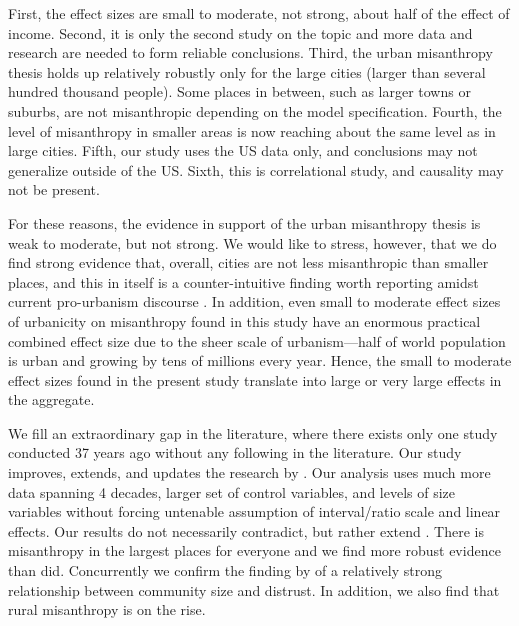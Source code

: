 \documentclass[11pt, letterpaper]{article}
\begin{document}
\begin{spacing}{1.4}
First, the effect sizes are small to moderate, not strong, about half of the
effect of income. 
Second, it is only the second study  \citep[after][]{wilson85} on the topic and more
data and research are needed to form  reliable conclusions. Third, the urban
misanthropy thesis holds up relatively robustly only for the large cities
(larger than several hundred thousand people). Some places in between, such as larger towns
or suburbs, are not misanthropic depending on the model specification. Fourth,
the level of misanthropy in smaller areas is now reaching about the same level
as in large cities. Fifth, our study uses the US data only, and conclusions may not
generalize outside of the US. Sixth, this is correlational study, and causality
may not be present. 
% 

For these reasons, the evidence in support of the urban misanthropy thesis is
 weak to moderate, but not strong.  
 We would like to stress, however, that we do find strong evidence that,
 overall,  cities are not less
misanthropic than smaller places, and this in itself is a counter-intuitive
finding worth reporting amidst current pro-urbanism discourse \cite[e.g.,][]{glaeser11}.
 In addition, even small to moderate effect sizes of urbanicity on misanthropy
 found in this study have an enormous practical combined effect size due to the
 sheer scale of urbanism---half of world population is urban and growing by tens
 of millions every year. Hence, the small to moderate effect sizes found in the
 present study translate into large or very large effects in the aggregate. 

We fill an extraordinary gap in the literature, where there exists only one
study conducted 37 years ago without any following in the literature. 
Our study improves, extends, and updates the  research by \citet{wilson85}.  
 Our analysis uses much more data spanning 4 decades, larger set of control variables, and levels of size variables without forcing
untenable assumption of interval/ratio scale and linear effects. Our results do
not necessarily contradict, but rather extend \citet{wilson85}. There is
misanthropy in the largest places for everyone and we find more robust evidence
than \citet{wilson85} did. Concurrently we confirm the finding by \citet{fischer81}
of a relatively strong relationship between community size and distrust. In
addition, we also find  that rural misanthropy is on the rise.



\end{spacing}
\end{document}
